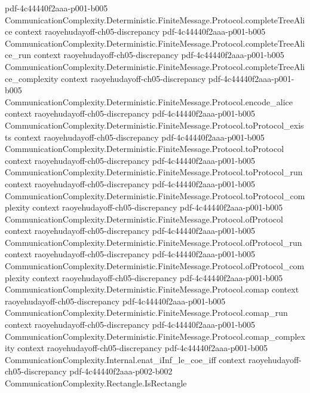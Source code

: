 \begin{theorem}
  {pdf-4c44440f2aaa-p001-b005}
\proofstep
  {CommunicationComplexity.Deterministic.FiniteMessage.Protocol.completeTreeAlice}
  {context}
  {raoyehudayoff-ch05-discrepancy}
  {pdf-4c44440f2aaa-p001-b005}
\proofstep
  {CommunicationComplexity.Deterministic.FiniteMessage.Protocol.completeTreeAlice_run}
  {context}
  {raoyehudayoff-ch05-discrepancy}
  {pdf-4c44440f2aaa-p001-b005}
\proofstep
  {CommunicationComplexity.Deterministic.FiniteMessage.Protocol.completeTreeAlice_complexity}
  {context}
  {raoyehudayoff-ch05-discrepancy}
  {pdf-4c44440f2aaa-p001-b005}
\proofstep
  {CommunicationComplexity.Deterministic.FiniteMessage.Protocol.encode_alice}
  {context}
  {raoyehudayoff-ch05-discrepancy}
  {pdf-4c44440f2aaa-p001-b005}
\proofstep
  {CommunicationComplexity.Deterministic.FiniteMessage.Protocol.toProtocol_exists}
  {context}
  {raoyehudayoff-ch05-discrepancy}
  {pdf-4c44440f2aaa-p001-b005}
\proofstep
  {CommunicationComplexity.Deterministic.FiniteMessage.Protocol.toProtocol}
  {context}
  {raoyehudayoff-ch05-discrepancy}
  {pdf-4c44440f2aaa-p001-b005}
\proofstep
  {CommunicationComplexity.Deterministic.FiniteMessage.Protocol.toProtocol_run}
  {context}
  {raoyehudayoff-ch05-discrepancy}
  {pdf-4c44440f2aaa-p001-b005}
\proofstep
  {CommunicationComplexity.Deterministic.FiniteMessage.Protocol.toProtocol_complexity}
  {context}
  {raoyehudayoff-ch05-discrepancy}
  {pdf-4c44440f2aaa-p001-b005}
\proofstep
  {CommunicationComplexity.Deterministic.FiniteMessage.Protocol.ofProtocol}
  {context}
  {raoyehudayoff-ch05-discrepancy}
  {pdf-4c44440f2aaa-p001-b005}
\proofstep
  {CommunicationComplexity.Deterministic.FiniteMessage.Protocol.ofProtocol_run}
  {context}
  {raoyehudayoff-ch05-discrepancy}
  {pdf-4c44440f2aaa-p001-b005}
\proofstep
  {CommunicationComplexity.Deterministic.FiniteMessage.Protocol.ofProtocol_complexity}
  {context}
  {raoyehudayoff-ch05-discrepancy}
  {pdf-4c44440f2aaa-p001-b005}
\proofstep
  {CommunicationComplexity.Deterministic.FiniteMessage.Protocol.comap}
  {context}
  {raoyehudayoff-ch05-discrepancy}
  {pdf-4c44440f2aaa-p001-b005}
\proofstep
  {CommunicationComplexity.Deterministic.FiniteMessage.Protocol.comap_run}
  {context}
  {raoyehudayoff-ch05-discrepancy}
  {pdf-4c44440f2aaa-p001-b005}
\proofstep
  {CommunicationComplexity.Deterministic.FiniteMessage.Protocol.comap_complexity}
  {context}
  {raoyehudayoff-ch05-discrepancy}
  {pdf-4c44440f2aaa-p001-b005}
\proofstep
  {CommunicationComplexity.Internal.enat_iInf_le_coe_iff}
  {context}
  {raoyehudayoff-ch05-discrepancy}
  {pdf-4c44440f2aaa-p002-b002}
\proofstep
  {CommunicationComplexity.Rectangle.IsRectangle}

\end{theorem}
